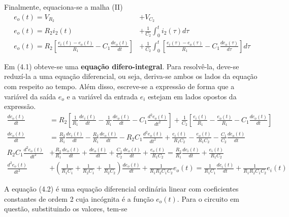 \documentclass{article}
\numberwithin{equation}{section}
\begin{document}
    Finalmente, equaciona-se a malha (II)
    \begin{align}
        e_{o}(t) = V_{ R_{2} } &+ V_{ C_{2} } \nonumber \\
        e_{o}(t) = R_{2} i_{2}(t) &+ \frac{ 1 }{ C_{2} } \int_{0}^{t} i_{2}(\tau) d\tau  \nonumber \\
        e_{o}(t) = R_{2} \left[ \frac{ e_{i}(t) - e_{o}(t) }{ R_{1}} - C_{1}\frac{ de_{o}(t) }{ dt } \right] &+ \frac{ 1 }{ C_{2} } \int_{0}^{t} \left[ \frac{ e_{i}(\tau) - e_{o}(\tau) }{ R_{1}} - C_{1}\frac{ de_{o}(\tau) }{ d\tau } \right] d\tau
    \end{align}

    Em (4.1) obteve-se uma \textbf{equação difero-integral}. Para resolvê-la, deve-se reduzí-la a uma equação diferencial, ou seja, deriva-se ambos os lados da equação com respeito ao tempo. Além disso, escreve-se a expressão de forma que a variável da saída $e_{o}$ e a variável da entrada $e_{i}$ estejam em lados opostos da expressão.
    \begin{align}
        \frac{de_{o}(t)}{dt} &= R_{2} \left[ \frac{1}{R_{1}} \frac{ de_{i}(t) }{ dt } - \frac{1}{R_{1}} \frac{ de_{o}(t) }{ dt } - C_{1}\frac{ d^2e_{o}(t) }{ dt^2 } \right] + \frac{ 1 }{ C_{2} } \left[ \frac{ e_{i}(t) }{ R_{1} } - \frac{ e_{o}(t) }{ R_{1} } - C_{1}\frac{ de_{o}(t) }{ dt } \right] \nonumber \\
        \frac{de_{o}(t)}{dt} &= \frac{R_{2}}{R_{1}} \frac{ de_{i}(t) }{ dt } - \frac{R_{2}}{R_{1}} \frac{ de_{o}(t) }{ dt } - R_{2}C_{1}\frac{ d^2e_{o}(t) }{ dt^2 } + \frac{ e_{i}(t) }{ R_{1}C_{2} } - \frac{ e_{o}(t) }{ R_{1}C_{2} } - \frac{C_{1}}{C_{2}} \frac{ de_{o}(t) }{ dt } \nonumber \\
        R_{2}C_{1}\frac{ d^2e_{o}(t) }{ dt^2 } &+ \frac{R_{2}}{R_{1}} \frac{ de_{o}(t) }{ dt }  + \frac{de_{o}(t)}{dt} + \frac{C_{1}}{C_{2}} \frac{ de_{o}(t) }{ dt } + \frac{ e_{o}(t) }{ R_{1}C_{2} } = \frac{R_{2}}{R_{1}} \frac{ de_{i}(t) }{ dt } + \frac{ e_{i}(t) }{ R_{1}C_{2} } \nonumber \\
        \frac{ d^2e_{o}(t) }{ dt^2 } &+ \left(\frac{1}{R_{1}C_{1}} + \frac{1}{R_{2}C_{1}} + \frac{1}{R_{2}C_{2}} \right) \frac{ de_{o}(t) }{ dt } + \frac{ 1 }{ R_{1}R_{2}C_{1}C_{2} }e_{o}(t) = \frac{1}{R_{1}C_{1}} \frac{ de_{i}(t) }{ dt } + \frac{ 1 }{ R_{1}R_{2}C_{1}C_{2} }e_{i}(t)
    \end{align}

    A equação (4.2) é uma equação diferencial ordinária linear com coeficientes constantes de ordem 2 cuja incógnita é a função $e_{o}(t)$. Para o circuito em questão, substituindo os valores, tem-se
\end{document}
